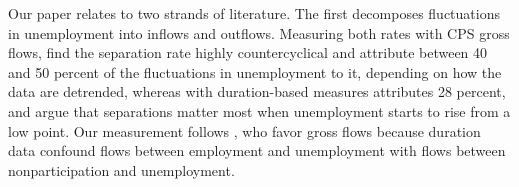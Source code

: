 \documentclass[authoryear, review, 12pt]{elsarticle}
\begin{document}
Our paper relates to two strands of literature. The first decomposes fluctuations in unemployment into inflows and outflows. Measuring both rates with CPS gross flows, \citet{fujita_2009} find the separation rate highly countercyclical and attribute between 40 and 50 percent of the fluctuations in unemployment to it, depending on how the data are detrended, whereas with duration-based measures \citet{shimer_2012} attributes 28 percent, and \citet{elsby_2009} argue that separations matter most when unemployment starts to rise from a low point. Our measurement follows \citet{fujita_2009}, who favor gross flows because duration data confound flows between employment and unemployment with flows between nonparticipation and unemployment.
\end{document}
